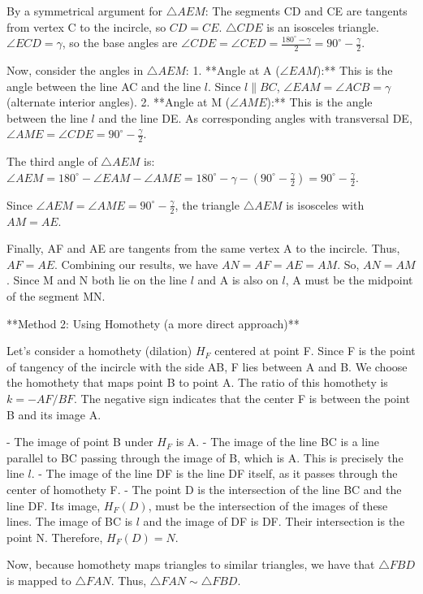 By a symmetrical argument for $\triangle AEM$:
The segments CD and CE are tangents from vertex C to the incircle, so $CD = CE$. $\triangle CDE$ is an isosceles triangle.
$\angle ECD = \gamma$, so the base angles are $\angle CDE = \angle CED = \frac{180^\circ - \gamma}{2} = 90^\circ - \frac{\gamma}{2}$.

Now, consider the angles in $\triangle AEM$:
1.  **Angle at A ($\angle EAM$):** This is the angle between the line AC and the line $l$. Since $l \parallel BC$, $\angle EAM = \angle ACB = \gamma$ (alternate interior angles).
2.  **Angle at M ($\angle AME$):** This is the angle between the line $l$ and the line DE. As corresponding angles with transversal DE, $\angle AME = \angle CDE = 90^\circ - \frac{\gamma}{2}$.

The third angle of $\triangle AEM$ is:
$\angle AEM = 180^\circ - \angle EAM - \angle AME = 180^\circ - \gamma - (90^\circ - \frac{\gamma}{2}) = 90^\circ - \frac{\gamma}{2}$.

Since $\angle AEM = \angle AME = 90^\circ - \frac{\gamma}{2}$, the triangle $\triangle AEM$ is isosceles with $AM = AE$.

Finally, AF and AE are tangents from the same vertex A to the incircle. Thus, $AF = AE$.
Combining our results, we have $AN = AF = AE = AM$.
So, $AN = AM$. Since M and N both lie on the line $l$ and A is also on $l$, A must be the midpoint of the segment MN.

**Method 2: Using Homothety (a more direct approach)**

Let's consider a homothety (dilation) $H_F$ centered at point F. Since F is the point of tangency of the incircle with the side AB, F lies between A and B. We choose the homothety that maps point B to point A. The ratio of this homothety is $k = -AF/BF$. The negative sign indicates that the center F is between the point B and its image A.

-   The image of point B under $H_F$ is A.
-   The image of the line BC is a line parallel to BC passing through the image of B, which is A. This is precisely the line $l$.
-   The image of the line DF is the line DF itself, as it passes through the center of homothety F.
-   The point D is the intersection of the line BC and the line DF. Its image, $H_F(D)$, must be the intersection of the images of these lines. The image of BC is $l$ and the image of DF is DF. Their intersection is the point N. Therefore, $H_F(D) = N$.

Now, because homothety maps triangles to similar triangles, we have that $\triangle FBD$ is mapped to $\triangle FAN$. Thus, $\triangle FAN \sim \triangle FBD$.


